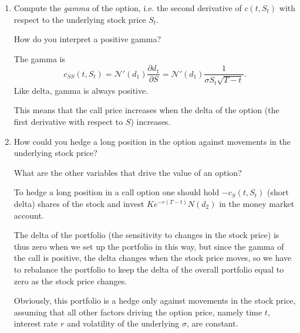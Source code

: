 \documentclass[handout,8pt]{beamer}
\begin{document}
\begin{frame}[allowframebreaks]{ }
\begin{enumerate}
\begin{enumerate}
        \newpage
        
        \vspace*{1cm}
        
        \item Compute the \textit{gamma} of the option, i.e. the second derivative of $c(t,S_t)$ with respect to the underlying stock price $S_t$. \newline
        
        How do you interpret a positive gamma? \newline
        
        The gamma is
        \begin{equation*}
            c_{SS}(t,S_t) = \mathcal{N}'(d_1)\frac{\partial d_1}{\partial S} =\mathcal{N}'(d_1) \frac{1}{\sigma S_t\sqrt{T-t}}.
        \end{equation*}
        Like delta, gamma is always positive. \newline
        
        This means that the call price increases when the delta of the option (the first derivative with respect to $S$) increases. \newline
        
        \newpage
        
        \vspace*{0.50cm}
        
        \item How could you hedge a long position in the option against movements in the underlying stock price? \newline
        
        What are the other variables that drive the value of an option? \newline
        
        To hedge a long position in a call option one should hold $-c_S(t,S_t)$ (short delta) shares of the 
        stock and invest $Ke^{-r(T-t)}N(d_2)$ in the money market account. \newline
        
        The delta of the portfolio (the sensitivity to changes in the stock price) is thus zero when we set up the portfolio in this way, but since the gamma of the call is positive, the delta changes when the stock price moves, so we have to rebalance the portfolio to keep the delta of the overall portfolio equal to zero as the stock price changes. \newline
        
        Obviously, this portfolio is a hedge only against movements in the stock price, assuming that all other factors driving the option price, namely time $t$, interest rate $r$ and volatility of the underlying $\sigma$, are constant.
    \end{enumerate}
    

\end{enumerate}
\end{frame}
\end{document}

